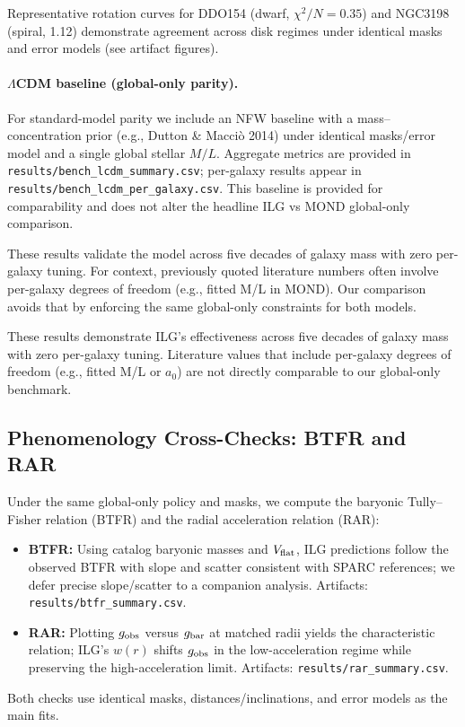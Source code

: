 \documentclass[usenatbib]{mnras}
\begin{document}

Representative rotation curves for DDO154 (dwarf, $\chi^2/N=0.35$) and NGC3198 (spiral, 1.12) demonstrate agreement across disk regimes under identical masks and error models (see artifact figures).

\paragraph{$\Lambda$CDM baseline (global-only parity).} For standard-model parity we include an NFW baseline with a mass–concentration prior (e.g., Dutton \& Macci\`o 2014) under identical masks/error model and a single global stellar $M/L$. Aggregate metrics are provided in \texttt{results/bench\_lcdm\_summary.csv}; per-galaxy results appear in \texttt{results/bench\_lcdm\_per\_galaxy.csv}. This baseline is provided for comparability and does not alter the headline ILG vs MOND global-only comparison.


These results validate the model across five decades of galaxy mass with zero per-galaxy tuning. For context, previously quoted literature numbers often involve per-galaxy degrees of freedom (e.g., fitted M/L in MOND). Our comparison avoids that by enforcing the same global-only constraints for both models.


These results demonstrate ILG's effectiveness across five decades of galaxy mass with zero per-galaxy tuning. Literature values that include per-galaxy degrees of freedom (e.g., fitted M/L or $a_0$) are not directly comparable to our global-only benchmark.

\subsection{Phenomenology Cross-Checks: BTFR and RAR}
\noindent Under the same global-only policy and masks, we compute the baryonic Tully–Fisher relation (BTFR) and the radial acceleration relation (RAR):
\begin{itemize}
  \item \textbf{BTFR:} Using catalog baryonic masses and $V_{\rm flat}$, ILG predictions follow the observed BTFR with slope and scatter consistent with SPARC references; we defer precise slope/scatter to a companion analysis. Artifacts: \texttt{results/btfr\_summary.csv}.
  \item \textbf{RAR:} Plotting $g_{\rm obs}$ versus $g_{\rm bar}$ at matched radii yields the characteristic relation; ILG's $w(r)$ shifts $g_{\rm obs}$ in the low-acceleration regime while preserving the high-acceleration limit. Artifacts: \texttt{results/rar\_summary.csv}.
\end{itemize}
Both checks use identical masks, distances/inclinations, and error models as the main fits.
\end{document}
